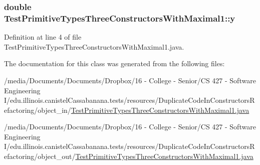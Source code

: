 \hypertarget{classTestPrimitiveTypesThreeConstructorsWithMaximal1_a2394335cbd3f9e110a4a07ed5352672c}{
\subsubsection[{y}]{\setlength{\rightskip}{0pt plus 5cm}double {\bf TestPrimitiveTypesThreeConstructorsWithMaximal1::y}}}
\label{classTestPrimitiveTypesThreeConstructorsWithMaximal1_a2394335cbd3f9e110a4a07ed5352672c}


Definition at line 4 of file TestPrimitiveTypesThreeConstructorsWithMaximal1.java.



The documentation for this class was generated from the following files:\begin{DoxyCompactItemize}
\item 
/media/Documents/Documents/Dropbox/16 -\/ College -\/ Senior/CS 427 -\/ Software Engineering I/edu.illinois.canistelCassabanana.tests/resources/DuplicateCodeInConstructorsRefactoring/object\_\-in/\hyperlink{object__in_2TestPrimitiveTypesThreeConstructorsWithMaximal1_8java}{TestPrimitiveTypesThreeConstructorsWithMaximal1.java}\item 
/media/Documents/Documents/Dropbox/16 -\/ College -\/ Senior/CS 427 -\/ Software Engineering I/edu.illinois.canistelCassabanana.tests/resources/DuplicateCodeInConstructorsRefactoring/object\_\-out/\hyperlink{object__out_2TestPrimitiveTypesThreeConstructorsWithMaximal1_8java}{TestPrimitiveTypesThreeConstructorsWithMaximal1.java}\end{DoxyCompactItemize}
